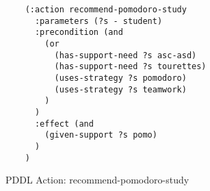 \begin{figure}[t]
    \begin{lstlisting}
    (:action recommend-pomodoro-study
      :parameters (?s - student)
      :precondition (and 
        (or
          (has-support-need ?s asc-asd)
          (has-support-need ?s tourettes)
          (uses-strategy ?s pomodoro)
          (uses-strategy ?s teamwork)
        )
      )
      :effect (and 
        (given-support ?s pomo)
      )
    )
    \end{lstlisting}
    \caption{PDDL Action: recommend-pomodoro-study}\label{fig:pddl-action-pomo-study}
    \end{figure}